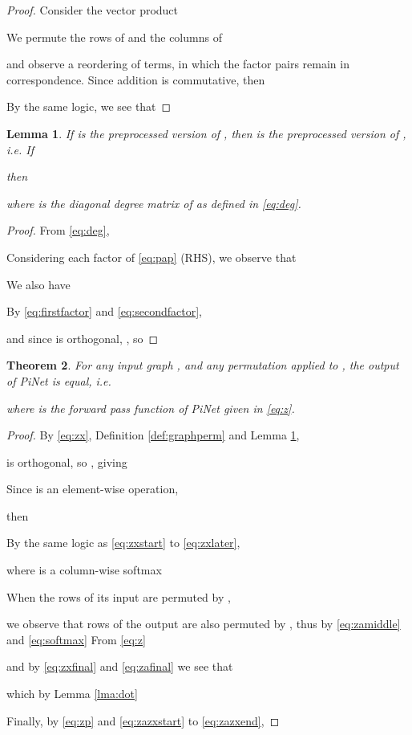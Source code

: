 \documentclass{article}
\newtheorem{theorem}{Theorem}[section]
\newtheorem{lemma}[theorem]{Lemma}
\theoremstyle{definition}
\begin{document}
\newcommand{\pin}[1]{{\pi^{-1}{(#1)}}}

\begin{proof}
    Consider the vector product
    
    We permute the rows of  and the columns of 
    
   and observe a reordering of terms, in which the factor pairs remain in correspondence. Since addition is commutative, then
    
    
  By the same logic, we see that
  
\end{proof}

\begin{lemma}
  \label{lma:pre}
  If  is the preprocessed version of , then  is the preprocessed version of , i.e. If
  
    then
  
  where  is the diagonal degree matrix of  as defined in \autoref{eq:deg}.
\end{lemma}

\begin{proof}
  From \autoref{eq:deg},
  
  Considering each factor of \autoref{eq:pap} (RHS), we observe that
  
  
  We also have
  
  By \autoref{eq:firstfactor} and \ref{eq:secondfactor},  
  \small
  
  and since  is orthogonal, , so
  
  \normalsize
\end{proof}

\begin{theorem}
  For any input graph , and any permutation  applied to , the output of PiNet is equal, i.e.
  
  where  is the forward pass function of PiNet given in \autoref{eq:z}.
\end{theorem}

\begin{proof}
  By \autoref{eq:zx}, Definition \ref{def:graphperm} and Lemma \ref{lma:pre},
  
 is orthogonal, so , giving

Since  is an element-wise operation,
  
then
  
  
  By the same logic as \autoref{eq:zxstart} to \ref{eq:zxlater},
  \small
  
  \normalsize
  
where  is a column-wise softmax
  
When the rows of its input are permuted by ,
  
  we observe that rows of the output are also permuted by , thus by \autoref{eq:zamiddle} and \ref{eq:softmax}
  \small
  \normalsize
From \autoref{eq:z}

and by \autoref{eq:zxfinal} and \ref{eq:zafinal} we see that
\small
  
  \normalsize
which by Lemma \ref{lma:dot}
  
  Finally, by \autoref{eq:zp} and \ref{eq:zazxstart} to \ref{eq:zazxend},
  
\end{proof}
\end{document}
